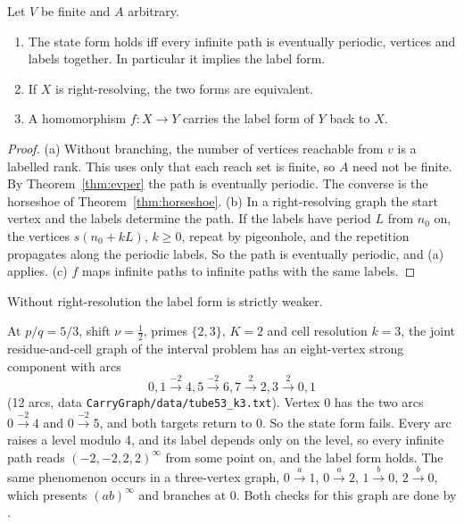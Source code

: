 \begin{proposition}\label{prop:state-label}
Let \(V\) be finite and \(A\) arbitrary.
\begin{enumerate}[label=(\alph*)]
\item The state form holds iff every infinite path is eventually periodic, vertices and labels
  together. In particular it implies the label form.
\item If \(X\) is right-resolving, the two forms are equivalent.
\item A homomorphism \(f:X\to Y\) carries the label form of \(Y\) back to \(X\).
\end{enumerate}
\end{proposition}

\begin{proof}
(a) Without branching, the number of vertices reachable from \(v\) is a labelled rank. This
uses only that each reach set is finite, so \(A\) need not be finite. By
Theorem~\ref{thm:evper} the path is eventually periodic. The converse is the horseshoe of
Theorem~\ref{thm:horseshoe}. (b) In a right-resolving graph the start vertex and the labels
determine the path. If the labels have period \(L\) from \(n_0\) on, the vertices
\(s(n_0+kL)\), \(k\ge0\), repeat by pigeonhole, and the repetition propagates along the
periodic labels. So the path is eventually periodic, and (a) applies. (c) \(f\) maps infinite
paths to infinite paths with the same labels.
\end{proof}

Without right-resolution the label form is strictly weaker.

\begin{example}\label{ex:tube}
At \(p/q=5/3\), shift \(\nu=\tfrac12\), primes \(\{2,3\}\), \(K=2\) and cell resolution \(k=3\),
the joint residue-and-cell graph of the interval problem has an eight-vertex strong component
with arcs
\[
0,1\xrightarrow{-2}4,5\xrightarrow{-2}6,7\xrightarrow{\;2\;}2,3\xrightarrow{\;2\;}0,1
\]
(12 arcs, data \texttt{CarryGraph/data/tube53\_k3.txt}). Vertex \(0\) has the two arcs
\(0\xrightarrow{-2}4\) and \(0\xrightarrow{-2}5\), and both targets return to \(0\). So the state
form fails. Every arc raises a level modulo 4, and its label depends only on the level, so
every infinite path reads \((-2,-2,2,2)^\infty\) from some point on, and the label form holds.
The same phenomenon occurs in a three-vertex graph, \(0\xrightarrow{a}1\), \(0\xrightarrow{a}2\),
\(1\xrightarrow{b}0\), \(2\xrightarrow{b}0\), which presents \((ab)^\infty\) and branches at
\(0\). Both checks for this graph are done by .
\end{example}

